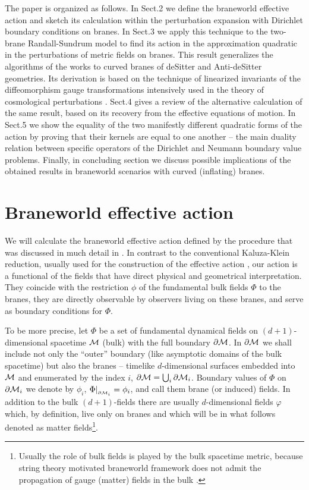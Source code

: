 \documentclass[a4paper,12pt]{article}
\newcommand{\M}{{\cal M}}
\newcommand{\dM}{{\partial \cal M}}
\begin{document}
The paper is organized as follows. In Sect.2 we define the
braneworld effective action and sketch its calculation within the
perturbation expansion with Dirichlet boundary conditions on
branes. In Sect.3 we apply this technique to the two-brane
Randall-Sundrum model \cite{RS} to find its action in the
approximation quadratic in the perturbations of metric fields on
branes. This result generalizes the algorithms of the works
\cite{brane, BWEA} to curved branes of deSitter and Anti-deSitter
geometries. Its derivation is based on the technique of linearized
invariants of the diffeomorphism gauge transformations intensively
used in the theory of cosmological perturbations
\cite{BFM,GarMonTanSas,efeqmy}. Sect.4 gives a review of the
alternative calculation \cite{BWEA} of the same result, based on
its recovery from the effective equations of motion. In Sect.5 we
show the equality of the two manifestly different quadratic forms
of the action by proving that their kernels are equal to one
another -- the main duality relation between specific operators of
the Dirichlet and Neumann boundary value problems. Finally, in
concluding section we discuss possible implications of the
obtained results in braneworld scenarios with curved (inflating)
branes.


\section{Braneworld effective action}
\hspace{\parindent}We will calculate the braneworld effective
action defined by the procedure that was discussed in much detail
in \cite{BWEA}. In contrast to the conventional Kaluza-Klein
reduction, usually used for the construction of the effective
action \cite{KubVol,Kub}, our action is a functional of the fields
that have direct physical and geometrical interpretation. They
coincide with the restriction $\phi$ of the fundamental bulk
fields $\Phi$ to the branes, they are directly observable by
observers living on these branes, and serve as boundary conditions
for $\Phi$.

To be more precise, let $\Phi$ be a set of fundamental dynamical
fields on $(d+1)$-dimensional spacetime $\M$ (bulk) with the full
boundary $\dM$. In $\dM$ we shall include not only the ``outer''
boundary (like asymptotic domains of the bulk spacetime) but also
the branes -- timelike $d$-dimensional surfaces embedded into $\M$
and enumerated by the index $i$, $\dM=\bigcup_{i}\dM_i$. Boundary
values of $\Phi$ on $\dM_i$ we denote by $\phi_i$,
$\Phi|_{_{\dM_i}}=\phi_i$, and call them brane (or induced)
fields. In addition to the bulk $(d+1)$-fields there are usually
$d$-dimensional fields $\varphi$ which, by definition, live only
on branes and which will be in what follows denoted as matter
fields\footnote{Usually the role of bulk fields is played by the
bulk spacetime metric, because string theory motivated braneworld
framework does not admit the propagation of gauge (matter) fields
in the bulk \cite{string}.}.
\end{document}
